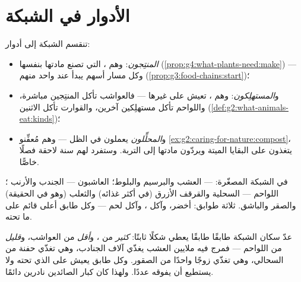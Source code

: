 \section{الأدوار في الشبكة}

\begin{definition}\label{def:g5:food-webs:roles}
تنقسم  الشبكة إلى أدوار:
\begin{itemize}
  \item \emph{المنتِجون}: وهم ، التي تصنع
        مادتها بنفسها
        (\cref{prop:g4:what-plants-need:make}) --- وكل مسار
        أسهم يبدأ عند واحد منهم
        (\cref{prop:g3:food-chains:start})؛
  \item و\emph{المستهلِكون}: وهم ، تعيش
        على غيرها --- فالعواشب تأكل المنتِجين مباشرة، واللواحم
        تأكل مستهلِكين آخرين، والقوارت تأكل الاثنين
        (\cref{def:g2:what-animals-eat:kinds})؛
  \item و\emph{المحلِّلون} يعملون في الظل --- وهم
        مُعفِّنو \cref{ex:g2:caring-for-nature:compost}، يتغذون
        على البقايا الميتة ويردّون مادتها إلى التربة. وستفرد لهم
        سنة لاحقة فصلًا خاصًّا.
\end{itemize}
\end{definition}

\begin{example}\label{ex:g5:food-webs:sorting}
في الشبكة المصغّرة:  --- العشب والبرسيم والبلوط؛
 العاشبون --- الجندب والأرنب ؛ 
اللواحم --- السحلية والقرقف الأزرق (في أكثر غذائه) والثعلب (وهو
 في الحقيقة) والصقر والباشق. ثلاثة طوابق: أخضر، وآكل ،
وآكل لحم --- وكل طابق أعلى قائم على ما تحته.
\end{example}

\begin{proposition}\label{prop:g5:food-webs:pyramid}
عدّ سكان الشبكة طابقًا طابقًا يعطي شكلًا ثابتًا: \emph{كثير} من
، و\emph{أقل} من العواشب، و\emph{قليل} من اللواحم ---
فمرج فيه ملايين  العشب يغذّي آلاف الجنادب، وهي تغذّي حفنة من
السحالي، وهي تغذّي زوجًا واحدًا من الصقور. وكل طابق يعيش على الذي
تحته ولا يستطيع أن يفوقه عددًا. ولهذا كان كبار الصائدين نادرين
دائمًا.
\end{proposition}
\admitted

